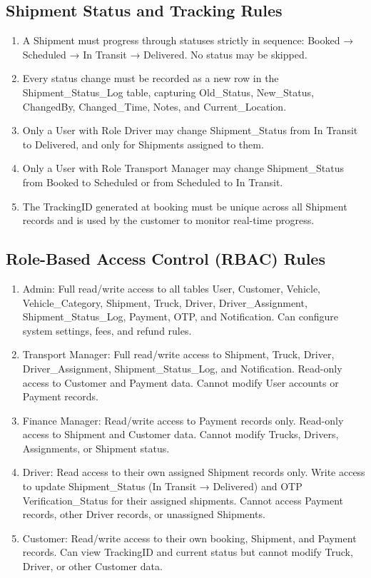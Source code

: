 \documentclass[12pt,a4paper]{report}
\begin{document}
\subsection{Shipment Status and Tracking Rules}
\begin{enumerate}
    \item A Shipment must progress through statuses strictly in sequence: Booked → Scheduled → In Transit → Delivered. No status may be skipped.
\item Every status change must be recorded as a new row in the Shipment\_Status\_Log table, capturing Old\_Status, New\_Status, ChangedBy, Changed\_Time, Notes, and Current\_Location.
\item Only a User with Role Driver may change Shipment\_Status from In Transit to Delivered, and only for Shipments assigned to them.
\item  Only a User with Role Transport Manager may change Shipment\_Status from Booked to Scheduled or from Scheduled to In Transit.
\item The TrackingID generated at booking must be unique across all Shipment records and is used by the customer to monitor real-time progress.

\end{enumerate}
\subsection{Role-Based Access Control (RBAC) Rules}
\begin{enumerate}
    \item Admin: Full read/write access to all tables User, Customer, Vehicle, Vehicle\_Category, Shipment, Truck, Driver, Driver\_Assignment, Shipment\_Status\_Log, Payment, OTP, and Notification. Can configure system settings, fees, and refund rules.
 \item Transport Manager: Full read/write access to Shipment, Truck, Driver, Driver\_Assignment, Shipment\_Status\_Log, and Notification. Read-only access to Customer and Payment data. Cannot modify User accounts or Payment records.
 \item Finance Manager: Read/write access to Payment records only. Read-only access to Shipment and Customer data. Cannot modify Trucks, Drivers, Assignments, or Shipment status.
 \item Driver: Read access to their own assigned Shipment records only. Write access to update Shipment\_Status (In Transit → Delivered) and OTP Verification\_Status for their assigned shipments. Cannot access Payment records, other Driver records, or unassigned Shipments.
 \item Customer: Read/write access to their own booking, Shipment, and Payment records. Can view TrackingID and current status but cannot modify Truck, Driver, or other Customer data.

\end{enumerate}
\end{document}

